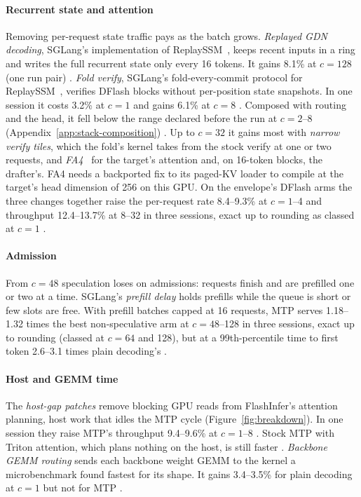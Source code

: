 \paragraph{Recurrent state and attention} Removing per-request state traffic pays as the batch grows. \emph{Replayed GDN decoding}, SGLang's implementation of ReplaySSM~\cite{replayssm}, keeps recent inputs in a ring and writes the full recurrent state only every 16 tokens. It gains 8.1\% at $c=128$ (one run pair) . \emph{Fold verify}, SGLang's fold-every-commit protocol for ReplaySSM~\cite{gdncode}, verifies DFlash blocks without per-position state snapshots. In one session it costs 3.2\% at $c=1$ and gains 6.1\% at $c=8$ . Composed with routing and the head, it fell below the range declared before the run at $c=2$--8 (Appendix~\ref{app:stack-composition}) . Up to $c=32$ it gains most with \emph{narrow verify tiles}, which the fold's kernel takes from the stock verify at one or two requests, and \emph{FA4}~\citep[FlashAttention~4;][]{fa4} for the target's attention and, on 16-token blocks, the drafter's. FA4 needs a backported fix to its paged-KV loader to compile at the target's head dimension of 256 on this GPU. On the envelope's DFlash arms the three changes together raise the per-request rate 8.4--9.3\% at $c=1$--4 and throughput 12.4--13.7\% at 8--32 in three sessions, exact up to rounding as classed at $c=1$ .

\paragraph{Admission} From $c=48$ speculation loses on admissions: requests finish and are prefilled one or two at a time. SGLang's \emph{prefill delay} holds prefills while the queue is short or few slots are free. With prefill batches capped at 16 requests, MTP serves 1.18--1.32 times the best non-speculative arm at $c=48$--128 in three sessions, exact up to rounding (classed at $c=64$ and 128), but at a 99th-percentile time to first token 2.6--3.1 times plain decoding's .

\paragraph{Host and GEMM time} The \emph{host-gap patches} remove blocking GPU reads from FlashInfer's attention planning, host work that idles the MTP cycle (Figure~\ref{fig:breakdown}). In one session they raise MTP's throughput 9.4--9.6\% at $c=1$--8 . Stock MTP with Triton attention, which plans nothing on the host, is still faster . \emph{Backbone GEMM routing} sends each backbone weight GEMM to the kernel a microbenchmark found fastest for its shape. It gains 3.4--3.5\% for plain decoding at $c=1$ but not for MTP .

